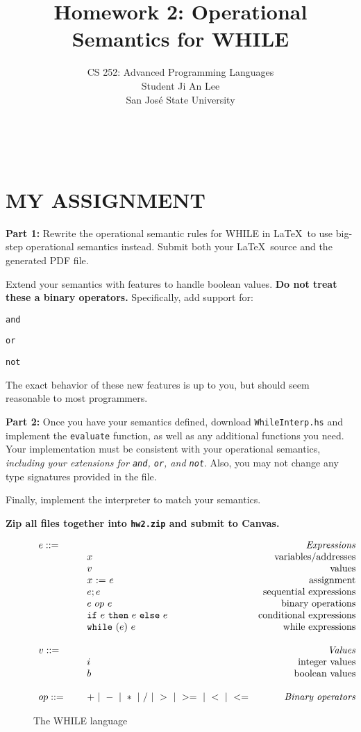\documentclass{article}
\title{Homework 2: Operational Semantics for WHILE}
\author{
  CS 252: Advanced Programming Languages \\
  Student Ji An Lee \\
  San Jos\'{e} State University \\
  }
\date{}
\newcommand{\mydefhead}[2]{\multicolumn{2}{l}{{#1}}&\mbox{\emph{#2}}\\}
\newcommand{\mydefcase}[2]{\qquad\qquad& #1 &\mbox{#2}\\}
\newcommand{\assign}[2]{#1~{:=}~#2}
\newcommand{\ife}[3]{\mbox{\tt if}~{#1}~\mbox{\tt then}~{#2}~\mbox{\tt else}~{#3}}
\newcommand{\whilee}[2]{\mbox{\tt while}~(#1)~#2}
\begin{document}
\maketitle

\
\section{MY ASSIGNMENT}

\noindent
{\bf Part 1:}
Rewrite the operational semantic rules for WHILE in \LaTeX\
to use big-step operational semantics instead.
Submit both your \LaTeX\ source and the generated PDF file.

Extend your semantics with features to handle boolean values.
{\bf Do not treat these a binary operators.}
Specifically, add support for:
\begin{compactitem}
  \item {\tt and}
  \item {\tt or}
  \item {\tt not}
\end{compactitem}

The exact behavior of these new features is up to you,
but should seem reasonable to most programmers.

\bigskip
\noindent
{\bf Part 2:}
Once you have your semantics defined,
download {\tt WhileInterp.hs} and implement the {\tt evaluate} function,
as well as any additional functions you need.
Your implementation must be consistent with your operational semantics,
{\it including your extensions for {\tt and}, {\tt or}, and {\tt not}}.
Also, you may not change any type signatures provided in the file.

Finally, implement the interpreter to match your semantics.

\bigskip
\noindent
{\bf Zip all files together into {\tt hw2.zip} and submit to Canvas.}

\begin{figure}\label{fig:lang}
\caption{The WHILE language}
\[
\begin{array}{llr}
  \mydefhead{e ::=\qquad\qquad\qquad\qquad}{Expressions}
  \mydefcase{x}{variables/addresses}
  \mydefcase{v}{values}
  \mydefcase{\assign x e}{assignment}
  \mydefcase{e; e}{sequential expressions}
  \mydefcase{e ~op~ e}{binary operations}
  \mydefcase{\ife e e e}{conditional expressions}
  \mydefcase{\whilee e e}{while expressions}
  \\
  \mydefhead{v ::=\qquad\qquad\qquad\qquad}{Values}
  \mydefcase{i}{integer values}
  \mydefcase{b}{boolean values}
  \\
  op ::= & + ~|~ - ~|~ * ~|~ / ~|~ > ~|~ >= ~|~ < ~|~ <=  & \mbox{\emph{Binary operators}} \\
\end{array}
\]
\end{figure}
\end{document}
